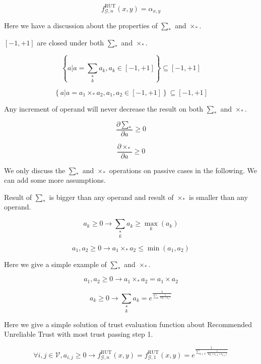 \documentclass{article}
\begin{document}
\begin{equation}
f_{\mathcal{G},n}^{\text{RUT}}(x,y)=\alpha _{x,y}
\end{equation}

Here we have a discussion about the properties of \(\sum _*\) and \(\times _*\).

\([-1,+1]\) are closed under both \(\sum _*\) and \(\times _*\).

\begin{equation}
\left\{a|a=\underset{k}{\sum _*}a_k,a_k\in [-1,+1]\right\}\subseteq [-1,+1]
\end{equation}

\begin{equation}
\left\{a|a=a_1\times _*a_2,a_1,a_2\in [-1,+1]\right\}\subseteq [-1,+1]
\end{equation}

Any increment of operand will never decrease the result on both \(\sum _*\) and \(\times _*\).

\begin{equation}
\frac{\partial \sum _*}{\partial a}\geq 0
\end{equation}

\begin{equation}
\frac{\partial \times _*}{\partial a}\geq 0
\end{equation}

We only discuss the \(\sum _*\) and \(\times _*\) operations on passive cases in the following. We can add some more assumptions.

Result of \(\sum _*\) is bigger than any operand and result of \(\times _*\) is smaller than any operand.

\[a_k\geq 0\to \underset{k}{\sum _*}a_k\geq \underset{k}{\max }\left(a_k\right)\]

\[a_1,a_2\geq 0\to a_1\times _*a_2\leq \min \left(a_1,a_2\right)\]

Here we give a simple example of \(\sum _*\) and \(\times _*\).

\[a_1,a_2\geq 0\to a_1\times _*a_2=a_1\times a_2\]

\[a_k\geq 0\to \underset{k}{\sum _*}a_k=e^{\frac{1}{\sum _k \frac{1}{\log \left(a_k\right)}}}\]

Here we give a simple solution of trust evaluation function about Recommended Unreliable Trust with most trust passing step 1.

\[\forall i,j\in \mathcal{V},a_{i,j}\geq 0\to f_{\mathcal{G},n}^{\text{RUT}}(x,y)=f_{\mathcal{G},1}^{\text{RUT}}(x,y)=e^{\frac{1}{\sum _{k\in \mathcal{V}}
\frac{1}{\log \left(a_{x,k}\times a_{k,y}\right)}}}\]
\end{document}
